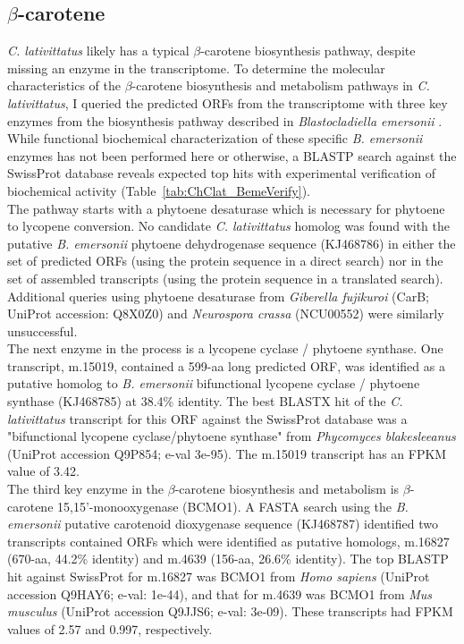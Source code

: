\subsection*{$\beta$-carotene} 
\textit{C. lativittatus} likely has a typical $\beta$-carotene biosynthesis pathway, despite missing an enzyme in the transcriptome. To determine the molecular characteristics of the $\beta$-carotene biosynthesis and metabolism pathways in \textit{C. lativittatus}, I queried the predicted ORFs from the transcriptome with three key enzymes from the biosynthesis pathway described in \textit{Blastocladiella emersonii} \cite{Avelar2014}. While functional biochemical characterization of these specific \textit{B. emersonii} enzymes has not been performed here or otherwise, a BLASTP search against the SwissProt database reveals expected top hits with experimental verification of biochemical activity (Table~\ref{tab:ChClat_BemeVerify}). \\
\indent The pathway starts with a phytoene desaturase which is necessary for phytoene to lycopene conversion. No candidate \textit{C. lativittatus} homolog was found with the putative \textit{B. emersonii} phytoene dehydrogenase sequence (KJ468786) in either the set of predicted ORFs (using the protein sequence in a direct search) nor in the set of assembled transcripts (using the protein sequence in a translated search). Additional queries using phytoene desaturase from \textit{Giberella fujikuroi} (CarB; UniProt accession: Q8X0Z0) and \textit{Neurospora crassa} (NCU00552) were similarly unsuccessful. \\
\indent The next enzyme in the process is a lycopene cyclase / phytoene synthase. One transcript, m.15019, contained a 599-aa long predicted ORF, was identified as a putative homolog to \textit{B. emersonii} bifunctional lycopene cyclase / phytoene synthase (KJ468785) at 38.4\% identity. The best BLASTX hit of the \textit{C. lativittatus} transcript for this ORF against the SwissProt database was a "bifunctional lycopene cyclase/phytoene synthase" from\textit{ Phycomyces blakesleeanus} (UniProt accession Q9P854; e-val 3e-95). The m.15019 transcript has an FPKM value of 3.42. \\
\indent The third key enzyme in the $\beta$-carotene biosynthesis and metabolism is $\beta$-carotene 15,15'-monooxygenase (BCMO1). A FASTA search using the \textit{B. emersonii} putative carotenoid dioxygenase sequence (KJ468787) identified two transcripts contained ORFs which were identified as putative homologs, m.16827 (670-aa, 44.2\% identity) and m.4639 (156-aa, 26.6\% identity). The top BLASTP hit against SwissProt for m.16827 was BCMO1 from \textit{Homo sapiens} (UniProt accession Q9HAY6; e-val: 1e-44), and that for m.4639 was BCMO1 from \textit{Mus musculus} (UniProt accession Q9JJS6; e-val: 3e-09). These transcripts had FPKM values of 2.57 and 0.997, respectively. \\
